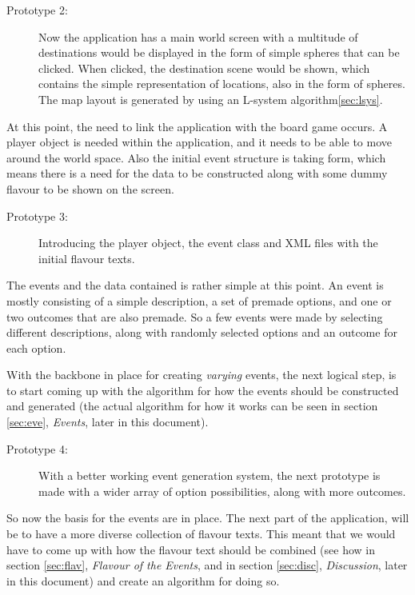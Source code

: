 \begin{description}
\item[Prototype 2:] Now the application has a main world screen with a multitude of destinations would be displayed in the form of simple spheres that can be clicked. When clicked, the destination scene would be shown, which contains the simple representation of locations, also in the form of spheres.
The map layout is generated by using an L-system algorithm\ref{sec:lsys}.
\end{description}

At this point, the need to link the application with the board game occurs. A player object is needed within the application, and it needs to be able to move around the world space. Also the initial event structure is taking form, which means there is a need for the data to be constructed along with some dummy flavour to be shown on the screen.

\begin{description}
\item[Prototype 3:] Introducing the player object, the event class and XML files with the initial flavour texts.
\end{description}

The events and the data contained is rather simple at this point. An event is mostly consisting of a simple description, a set of premade options, and one or two outcomes that are also premade. So a few events were made by selecting different descriptions, along with randomly selected options and an outcome for each option.

With the backbone in place for creating \textit{varying} events, the next logical step, is to start coming up with the algorithm for how the events should be constructed and generated (the actual algorithm for how it works can be seen in section \ref{sec:eve}, \textit{Events}, later in this document).

\begin{description}
\item[Prototype 4:] With a better working event generation system, the next prototype is made with a wider array of option possibilities, along with more outcomes.
\end{description}

So now the basis for the events are in place. The next part of the application, will be to have a more diverse collection of flavour texts.
This meant that we would have to come up with how the flavour text should be combined (see how in section \ref{sec:flav}, \textit{Flavour of the Events}, and in section \ref{sec:disc}, \textit{Discussion}, later in this document) and create an algorithm for doing so. 

